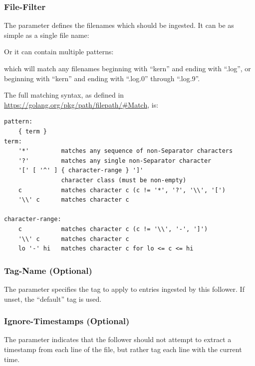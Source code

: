 \subsubsection{File-Filter}

The  parameter defines the filenames which should be
ingested. It can be as simple as a single file name:


Or it can contain multiple patterns:


which will match any filenames beginning with ``kern'' and ending with
``.log'', or beginning with ``kern'' and ending with ``.log.0''
through ``.log.9''.

The full matching syntax, as defined
in \href{https://golang.org/pkg/path/filepath/\#Match}{https://golang.org/pkg/path/filepath/\#Match}, is:

\begin{Verbatim}[breaklines=true]
pattern:
    { term }
term:
    '*'         matches any sequence of non-Separator characters
    '?'         matches any single non-Separator character
    '[' [ '^' ] { character-range } ']'
                character class (must be non-empty)
    c           matches character c (c != '*', '?', '\\', '[')
    '\\' c      matches character c

character-range:
    c           matches character c (c != '\\', '-', ']')
    '\\' c      matches character c
    lo '-' hi   matches character c for lo <= c <= hi
\end{Verbatim}

\subsubsection{Tag-Name (Optional)}

The  parameter specifies the tag to apply to entries
ingested by this follower. If unset, the ``default'' tag is used.

\subsubsection{Ignore-Timestamps (Optional)}

The  parameter indicates that the follower should
not attempt to extract a timestamp from each line of the file, but
rather tag each line with the current time.

